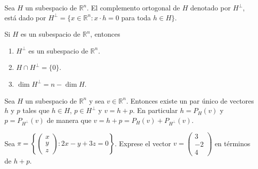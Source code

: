 \begin{defin}
Sea $H$ un subespacio de $\mathbb{R}^n$. El complemento ortogonal de $H$ denotado por $H^\perp$, está dado por $H^\perp = \{ x \in \mathbb{R}^n: x \cdot h =0$ para toda $h \in H \}$.
\end{defin}


\begin{thm}
Si $H$ es un subespacio de $\mathbb{R}^n$, entonces

\begin{enumerate}
\item
$H^\perp$ es un subespacio de $\mathbb{R}^n$.

\item
$H \cap H^\perp = \{ 0 \}$.

\item
$\dim H^\perp = n-\dim H$.

\end{enumerate}
\end{thm}

\begin{defin}
Sea $H$ un subespacio de $\mathbb{R}^n$ y sea $v \in \mathbb{R}^n$. Entonces existe un par único de vectores $h$ y $p$ tales que $h \in H$, $p \in H^\perp$ y $v = h + p$. En particular $h = P_H(v)$ y $p = P_{H^\perp}(v)$ de manera que $v = h+p = P_H(v) + P_{H^\perp}(v)$.
\end{defin}








\begin{ejer}
Sea $\pi = \left\{ \begin{pmatrix} x \\ y \\ z \end{pmatrix}: 2x-y+3z=0 \right\}$. Exprese el vector $v = \begin{pmatrix} 3 \\ -2 \\ 4 \end{pmatrix}$ en términos de $h+p$.
\end{ejer} 










